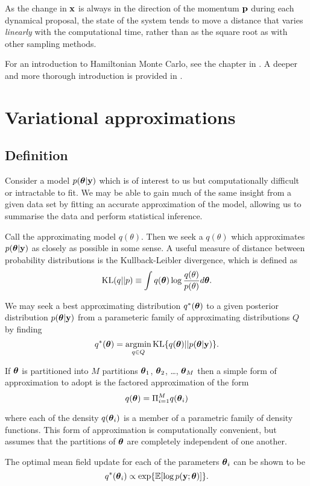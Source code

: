 \documentclass{amsart}[12pt]
\begin{document}
As the change in ${\bf x}$ is always in the direction of the momentum ${\bf p}$ during each dynamical proposal, the
state of the system tends to move a distance that varies \emph{linearly} with the computational time, rather
than as the square root as with other sampling methods.

For an introduction to Hamiltonian Monte Carlo, see the chapter in \cite{MacKay:2002:ITI:971143}. A deeper
and more thorough introduction is provided in \cite{Betancourt2017}.


\section{Variational approximations}

\subsection{Definition}

Consider a model $p({\boldsymbol \theta}|{\bf y})$ which is of interest to us but computationally difficult or intractable to 
fit. We may be able to gain much of the same insight from a given data set by fitting an accurate approximation 
of the model, allowing us to summarise the data and perform statistical inference.

Call the approximating model $q(\theta)$. Then we seek a $q(\theta)$ which approximates $p({\boldsymbol \theta}|{\bf y})$
as closely as possible in some sense. A useful measure of distance between probability distributions is the
Kullback-Leibler divergence, which is defined as
\[
	\text{KL}(q || p) \equiv \int q({\boldsymbol \theta}) \log{\frac{q(\theta)}{p(\theta)}} d {\boldsymbol \theta}.
\]

We may seek a best approximating distribution $q^*({\boldsymbol \theta})$ to a given posterior distribution
$p({\boldsymbol \theta}|{\bf y})$ from a parameteric family of approximating distributions $Q$ by finding
\[
	q^*(\vtheta) = \argmin_{q \in Q} \KL \{ {q(\vtheta) || p(\vtheta|\vy)} \}.
\]

If ${\boldsymbol \theta}$ is partitioned into $M$ partitions ${\boldsymbol \theta}_1$, ${\boldsymbol \theta}_2$, \ldots, ${\boldsymbol \theta}_M$ then a 
simple form of approximation to adopt is the factored approximation of the form
\[
	q({\boldsymbol \theta}) = \Pi_{i=1}^M q({\boldsymbol \theta}_i)
\]

where each of the density $q({\boldsymbol \theta}_i)$ is a member of a parametric family of density functions. This form of
approximation is computationally convenient, but assumes that the partitions of ${\boldsymbol \theta}$ are completely
independent of one another.

The optimal mean field update for each of the parameters ${\boldsymbol \theta}_i$ can be shown to be
\[
	q^*({\boldsymbol \theta}_i) \propto \exp \{ \mathbb{E} [\log p({\bf y}; {\boldsymbol \theta})] \}.
\]
\end{document}
